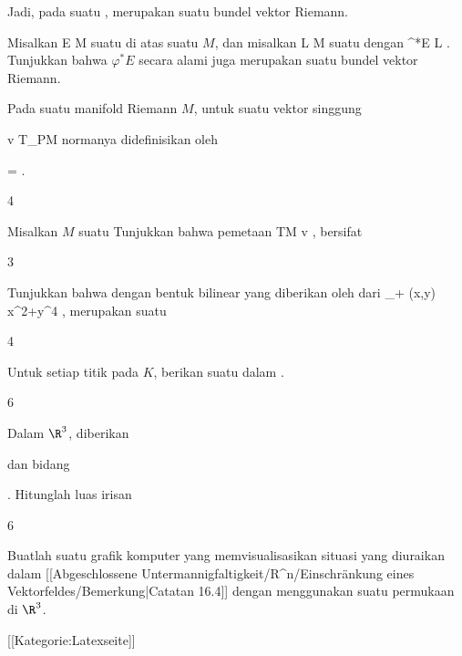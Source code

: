 Jadi, pada suatu
,
merupakan suatu bundel vektor Riemann.

{}
{

Misalkan
 { E } { M
} {}
suatu
di atas suatu
$M$, dan misalkan
\maabb {\varphi} { L } { M
} {}
suatu
dengan
\maabb {} {\varphi^*E} {L
} {.}
Tunjukkan bahwa $\varphi^*E$ secara alami juga merupakan suatu bundel vektor Riemann.

}
{} {}


Pada suatu manifold Riemann $M$, untuk suatu vektor singgung

\mavergleichskette
{\vergleichskette
{ v
}
{ \in }{ T_PM
}
{  }{
}
{    }{
}
{   }{
}
}
{}{}{}
normanya didefinisikan oleh

\mavergleichskette
{\vergleichskette
{  \Vert
}
{ = }{ 
}
{  }{
}
{    }{
}
{   }{
}
}
{}{}{.}

{4}
{

Misalkan $M$ suatu
Tunjukkan bahwa pemetaan
\maabbeledisp {} {TM} {\R
} { v } {  \Vert
} {,}
bersifat

}
{} {}

{3}
{

Tunjukkan bahwa
\mathl{\R \times \R_+}{} dengan bentuk bilinear yang diberikan oleh
 dari
 {\R \times \R_+} {\R
} {(x,y)} { x^2+y^4
} {,}
merupakan suatu

}
{} {}

{4}
{

Untuk setiap titik
 pada
$K$, berikan suatu
dalam
 {} {.}

}
{} {}

{6}
{

Dalam $\R^3$, diberikan

 {  }
dan bidang

 {  }.
Hitunglah luas irisan

}
{} {}

{6}
{

Buatlah suatu grafik komputer yang memvisualisasikan situasi yang diuraikan dalam
[[Abgeschlossene Untermannigfaltigkeit/R^n/Einschränkung eines Vektorfeldes/Bemerkung|Catatan 16.4]]
dengan menggunakan suatu permukaan di $\R^3$.

}
{} {}

 [[Kategorie:Latexseite]]
